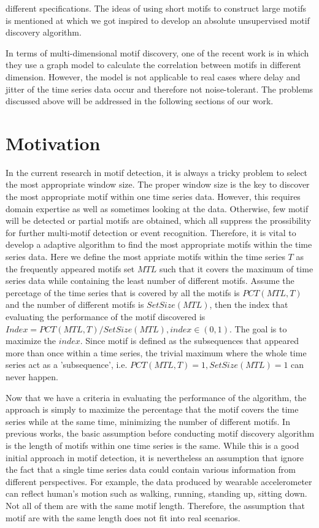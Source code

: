 \documentclass{article}
\begin{document}
different specifications. The ideas of using short motifs to construct large motifs is mentioned at \cite{Saria:2011:DDM:2283516.2283640} which we got inspired to develop an absolute unsupervised motif discovery algorithm. 

In terms of multi-dimensional motif discovery, one of the recent work is \cite{Vahdatpour09towardunsupervised} in which they use a graph model to calculate the correlation between motifs in different dimension. However, the model is not applicable to real cases where delay and jitter of the time series data occur and therefore not noise-tolerant. The problems discussed above will be addressed in the following sections of our work. 

\section{Motivation}
In the current research in motif detection, it is always a tricky problem to select the most appropriate window size. The proper window size
is the key to discover the most appropriate motif within one time series data. However, this requires domain expertise as 
well as sometimes looking at the data. Otherwise, few motif will be detected or partial motifs are obtained, which all suppress the prossibility 
for further multi-motif detection or event recognition. Therefore, it is vital to develop a adaptive algorithm to find the most
appropriate motifs within the time series data. Here we define the most appriate motifs within the time series $T$ as the frequently appeared motifs 
set $MTL$ such that it covers the maximum of time series data while containing the least number of different motifs. Assume the percetage of the 
time series that is covered by all the motifs is $PCT(MTL,T)$ and the number of different motifs is $SetSize(MTL)$, then the index that evaluating 
the performance of the motif discovered is $Index = PCT(MTL,T)/SetSize(MTL), index \in (0,1)$. The goal is to maximize the $index$. 
Since motif is defined as the subsequences that appeared more than once within a time series, the trivial maximum where the whole time series act as a 'subsequence', i.e. $PCT(MTL,T)=1,SetSize(MTL)=1$ can never happen. 

Now that we have a criteria in evaluating the performance of the algorithm, the approach is simply to maximize the percentage that the motif covers the 
time series while at the same time, minimizing the number of different motifs. In previous works, the basic assumption before conducting motif discovery algorithm 
is the length of motifs within one time series is the same. While this is a good initial approach in motif detection, it is nevertheless an assumption that ignore the fact that 
a single time series data could contain various information from different perspectives. For example, the data produced by wearable accelerometer can reflect human's motion 
such as walking, running, standing up, sitting down. Not all of them are with the same motif length. Therefore, the assumption that motif are with the same length does not fit into real scenarios. 
\end{document}
